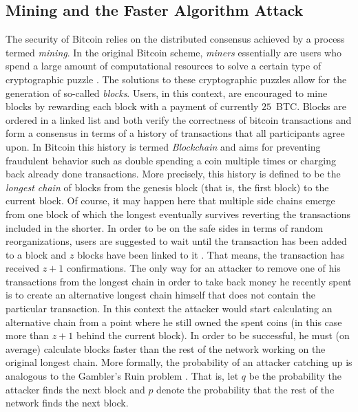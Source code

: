 \documentclass{sig-alternate}
\begin{document}
\subsection{Mining and the Faster Algorithm Attack}

The security of Bitcoin relies on the distributed consensus achieved by a process termed \emph{mining}.
In the original Bitcoin scheme, \emph{miners} essentially are users who spend a large amount of computational resources to solve a certain type of cryptographic puzzle \cite{nakamoto2008bitcoin}.
The solutions to these cryptographic puzzles allow for the generation of so-called \emph{blocks}. Users, in this context, are encouraged to mine blocks by rewarding each block with a payment of currently $25$~BTC.
Blocks are ordered in a linked list and both verify the correctness of bitcoin transactions and form a consensus in terms of a history of transactions that all participants agree upon.
In Bitcoin this history is termed \emph{Blockchain} and aims for preventing fraudulent behavior such as double spending a coin multiple times \cite{karame2012double} or charging back already done transactions.
More precisely, this history is defined to be the \emph{longest chain} of blocks from the genesis block (that is, the first block) to the current block.
Of course, it may happen here that multiple side chains emerge from one block of which the longest  eventually survives reverting the transactions included in the shorter.
In order to be on the safe sides in terms of random reorganizations, users are suggested to wait until the transaction has been added to a block and $z$ blocks have been linked to it \cite{nakamoto2008bitcoin}. That means, the transaction has received $z + 1$ confirmations.
The only way for an attacker to remove one of his transactions from the longest chain in order to take back money he recently spent is to create an alternative longest chain himself that does not contain the particular transaction.
In this context the attacker would start calculating an alternative chain from a point where he still owned the spent coins (in this case more than $z + 1$ behind the current block).
In order to be successful, he must (on average) calculate blocks faster than the rest of the network working on the original longest chain.
More formally, the probability of an attacker catching up is analogous to the Gambler's Ruin problem \cite{feller2008introduction,nakamoto2008bitcoin}.
That is, let $q$ be the probability the attacker finds the next block and $p$ denote the probability that the rest of the network finds the next block.
\end{document}
